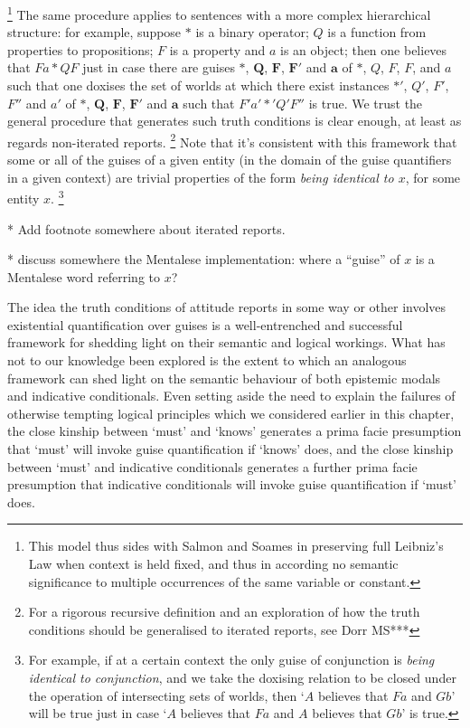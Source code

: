 \documentclass[If.tex]{subfiles}
\begin{document}
\footnote{This model thus sides with Salmon and Soames in preserving full Leibniz's Law when context is held fixed, and thus in according no semantic significance to multiple occurrences of the same variable or constant.}
The same procedure applies to sentences with a more complex hierarchical structure: for example, suppose $*$ is a binary operator; $Q$ is a function from properties to propositions; $F$ is a property and $a$ is an object; then one believes that $Fa * QF$ just in case there are guises $\boldsymbol{*}$, $\mathbf{Q}$, $\mathbf{F}$, $\mathbf{F'}$ and $\mathbf{a}$ of $*$, $Q$, $F$, $F$, and $a$ such that one doxises the set of worlds at which there exist instances $*'$, $Q'$, $F'$, $F''$ and $a'$ of $\boldsymbol{*}$, $\mathbf{Q}$, $\mathbf{F}$, $\mathbf{F'}$ and $\mathbf{a}$ such that $F'a' *' Q'F''$ is true.  We trust the general procedure that generates such truth conditions is clear enough, at least as regards non-iterated reports.%
\footnote{For a rigorous recursive definition and an exploration of how the truth conditions should be generalised to iterated reports, see Dorr MS***}  
Note that it's consistent with this framework that some or all of the guises of a given entity (in the domain of the guise quantifiers in a given context) are trivial properties of the form \emph{being identical to $x$}, for some entity $x$.%
\footnote{For example, if at a certain context the only guise of conjunction is \emph{being identical to conjunction}, and we take the doxising relation to be closed under the operation of intersecting sets of worlds, then ‘$A$ believes that $Fa$ and $Gb$’ will be true just in case ‘$A$ believes that $Fa$ and $A$ believes that $Gb$’ is true.}

* Add footnote somewhere about iterated reports.  

* discuss somewhere the Mentalese implementation: where a “guise” of $x$ is a Mentalese word referring to $x$?

The idea the truth conditions of attitude reports in some way or other involves existential quantification over guises is a well-entrenched and successful framework for shedding light on their semantic and logical workings.  What has not to our knowledge been explored is the extent to which an analogous framework can shed light on the semantic behaviour of both epistemic modals and indicative conditionals.  Even setting aside the need to explain the failures of otherwise tempting logical principles which we considered earlier in this chapter, the close kinship between ‘must’ and ‘knows’ generates a prima facie presumption that ‘must’ will invoke guise quantification if ‘knows’ does, and the close kinship between ‘must’ and indicative conditionals generates a further prima facie presumption that indicative conditionals will invoke guise quantification if ‘must’ does.  
\end{document}
